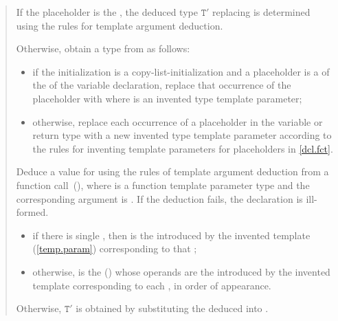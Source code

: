 \begin{quote}
\pnum
If the placeholder is the  
, the deduced type
$\mathtt{T}'$ replacing  is determined using the rules for template 
argument deduction.
% 
%
\begin{addedblock}
Otherwise, obtain a type  from  as follows:
\begin{itemize}
\item if the initialization is a copy-list-initialization
and a placeholder is a  of the 
 of the variable declaration, replace that 
occurrence of the placeholder with 
where  is an invented type template parameter;

\item otherwise, replace each occurrence of a placeholder in the
variable or return type with a new invented type template parameter
according to the rules for inventing template parameters
for placeholders in \ref{dcl.fct}. 
\end{itemize}
\end{addedblock}
%
Deduce a value for  
 using the rules
of template argument deduction from a function 
call~(),
where  is a
function template parameter type and
the corresponding argument is .
% 
If the deduction fails, the declaration is ill-formed.
% 
\begin{addedblock}
\begin{itemize}
\item if there is single ,
then  is the  introduced
by the invented template  (\ref{temp.param})
corresponding to that ;
\item otherwise,  is the 
() whose operands are the 
 introduced by the invented
template  corresponding to
each , in order of appearance.
\end{itemize}
\end{addedblock}
% 
%
Otherwise, $\mathtt{T}'$ is obtained by
substituting the deduced 
into .


\end{quote}
